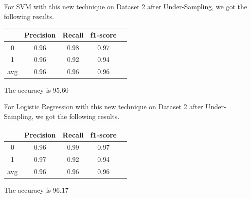For SVM with this new technique on Dataset 2 after Under-Sampling, we got the following results.

\begin{center}
\begin{tabular}{| c | c | c | c | c |}
\hline
    & Precision & Recall & f1-score \\
\hline
0 & 0.96 & 0.98 & 0.97 \\
\hline
1 & 0.96 & 0.92 & 0.94 \\
\hline
avg & 0.96 & 0.96 & 0.96 \\
\hline
\end{tabular}
\end{center} 
\begin{center}
The accuracy is 95.60%
\end{center}

For Logistic Regression with this new technique on Dataset 2 after Under-Sampling, we got the following results.

\begin{center}
\begin{tabular}{| c | c | c | c | c |}
\hline
    & Precision & Recall & f1-score \\
\hline
0 & 0.96 & 0.99 & 0.97 \\
\hline
1 & 0.97 & 0.92 & 0.94 \\
\hline
avg & 0.96 & 0.96 & 0.96 \\
\hline
\end{tabular}
\end{center} 
\begin{center}
The accuracy is 96.17%
\end{center}
